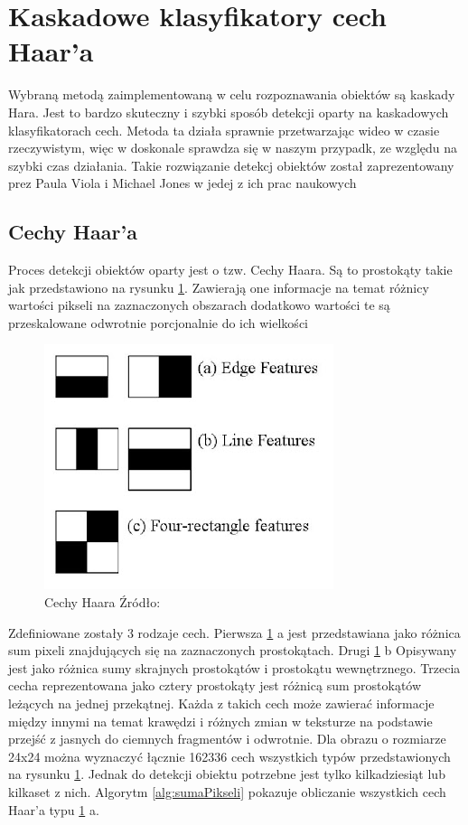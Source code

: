 \section{Kaskadowe klasyfikatory cech Haar'a}

Wybraną metodą zaimplementowaną w celu rozpoznawania obiektów są kaskady Hara. Jest to bardzo skuteczny i szybki sposób detekcji oparty na kaskadowych klasyfikatorach cech. Metoda ta działa sprawnie przetwarzając wideo w czasie rzeczywistym, więc w doskonale sprawdza się w naszym przypadk, ze względu na szybki czas działania. Takie rozwiązanie detekcj obiektów został zaprezentowany prez Paula Viola i Michael Jones w jedej z ich prac naukowych \cite{violaJones}

\subsection{Cechy Haar'a}
Proces detekcji obiektów oparty jest o tzw. Cechy Haara. Są to prostokąty takie jak przedstawiono na rysunku \ref{fig:cechyHaara}. Zawierają one informacje na temat różnicy wartości pikseli na zaznaczonych obszarach dodatkowo wartości te są przeskalowane odwrotnie porcjonalnie do ich wielkości
\begin{figure}[H]
\centering
\includegraphics[scale=0.5]{imgs/cechy.jpg}
\caption{{Cechy Haara Źródło:} \cite{faceDetectionOpenCV}}
\label{fig:cechyHaara}
\end{figure}

Zdefiniowane zostały 3 rodzaje cech. Pierwsza \ref{fig:cechyHaara} a jest przedstawiana jako różnica sum pixeli znajdujących się na zaznaczonych prostokątach. Drugi \ref{fig:cechyHaara} b  Opisywany jest jako różnica sumy skrajnych prostokątów i prostokątu wewnętrznego. Trzecia cecha reprezentowana jako cztery prostokąty jest różnicą sum prostokątów leżących na jednej przekątnej. Każda z takich cech może zawierać informacje między innymi na temat krawędzi i różnych zmian w teksturze na podstawie przejść z jasnych do ciemnych fragmentów i odwrotnie. Dla obrazu o rozmiarze 24x24 można wyznaczyć łącznie 162336 cech wszystkich typów przedstawionych na rysunku \ref{fig:cechyHaara}. Jednak do detekcji obiektu potrzebne jest tylko kilkadziesiąt lub kilkaset z nich. Algorytm \ref{alg:sumaPikseli} pokazuje obliczanie wszystkich cech Haar'a typu \ref{fig:cechyHaara} a.

